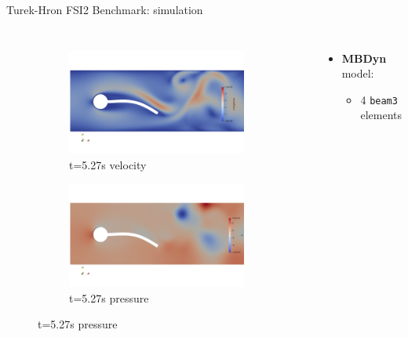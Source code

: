 \documentclass[10pt,t]{beamer}
\begin{document}
\begin{frame}{Turek-Hron FSI2 Benchmark: simulation}
\begin{columns}
\begin{figure}[htb]
\begin{subfigure}{0.5\textwidth}
  \includegraphics[width=\linewidth, trim=0 120 0 120, clip]{images/FSI2/fsi2_v3.png}
  \caption{t=5.27s velocity}
  \label{fig:fsi2_v3}
\end{subfigure}\hfil %
\begin{subfigure}{0.5\textwidth}
  \includegraphics[width=\linewidth, trim=0 120 0 120, clip]{images/FSI2/fsi2_p3.png}
  \caption{t=5.27s pressure}
  \label{fig:fsi2_p3}
\end{subfigure}\hfil %

\label{fig:FSI2_sol}
\end{figure}


\footnotesize
\begin{itemize}
    \itemsep 10pt
    \item \textbf{MBDyn} model:
    \begin{itemize}
        \item 4 \texttt{beam3} elements 
    \end{itemize}
    

\end{itemize}
\end{columns}
\end{frame}
\end{document}
